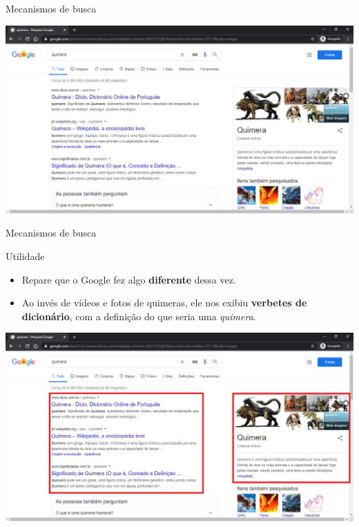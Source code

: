 \begin{frame}{Mecanismos de busca}

	\centering
	\includegraphics[width=1\linewidth]{Figuras/Ch03/fig3}
\end{frame}


\begin{frame}{Mecanismos de busca}
	\begin{block}{Utilidade}
		\begin{itemize}
			\item Repare que o Google fez algo \textbf{diferente} dessa vez.
			\item Ao invés de vídeos e fotos de quimeras, ele nos exibiu \textbf{verbetes de dicionário}, com a definição do que seria uma \textit{quimera}.
		\end{itemize}
	\end{block}

	\centering
	\includegraphics[width=0.8\linewidth]{Figuras/Ch03/fig4}
\end{frame}


